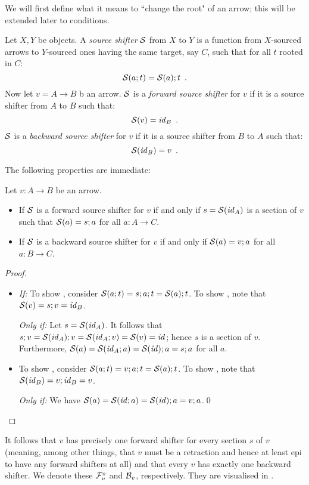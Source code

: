 We will first define what it means to ``change the root" of an arrow; this will be extended later to conditions.
%
\begin{definition}
Let $X,Y$ be objects. A \emph{source shifter} $\mathcal{S}$ from $X$ to $Y$ is a function from $X$-sourced arrows to $Y$-sourced ones having the same target, say $C$, such that for all $t$ rooted in $C$:
%
\begin{equation}\eqlabel{shifters are functors}
\cS(a;t) = \cS(a);t \enspace.
\end{equation}
%
Now let $v=A\to B$ b an arrow. $\mathcal{S}$ is a \emph{forward source shifter} for $v$ if it is a source shifter from $A$ to $B$ such that:
%
\begin{equation}\eqlabel{forward condition}
\cS(v) = \id_B \enspace.
\end{equation}
%
$\mathcal{S}$ is a \emph{backward source shifter} for $v$ if it is a source shifter from $B$ to $A$ such that:
%
\begin{equation}\eqlabel{backward condition}
\cS(\id_B) = v \enspace.
\end{equation}
\end{definition}
%
The following properties are immediate:
%
\begin{proposition}
Let $v:A\to B$ be an arrow.
\begin{itemize}
\item If $\mathcal{S}$ is a forward source shifter for $v$ if and only if $s=\mathcal{S}(\mathit{id}_A)$ is a section of $v$ such that $\mathcal{S}(a)=s;a$ for all $a:A\to C$.
\item If $\mathcal{S}$ is a backward source shifter for $v$ if and only if $\mathcal{S}(a)=v;a$ for all $a:B\to C$.
\end{itemize}
\end{proposition}
%
\begin{proof}~
\begin{itemize}
\item \textit{If:} To show , consider $\mathcal{S}(a;t)=s;a;t=\mathcal{S}(a);t$. To show , note that $\mathcal{S}(v)=s;v=\mathit{id}_B$.

\smallskip
\textit{Only if:} Let $s=\mathcal{S}(\mathit{id}_A)$. It follows that $s;v=\mathcal{S}(\mathit{id}_A);v=\mathcal{S}(\mathit{id}_A;v)=\mathcal{S}(v)=\mathit{id}$; hence $s$ is a section of $v$. Furthermore, $\mathcal{S}(a)=\mathcal{S}(\mathit{id}_A;a)=\mathcal{S}(\mathit{id});a=s;a$ for all $a$.

\item {} To show , consider $\mathcal{S}(a;t)=v;a;t=\mathcal{S}(a);t$. To show , note that $\mathcal{S}(\mathit{id}_B)=v;\mathit{id}_B=v$.

\smallskip
\textit{Only if:} We have $\mathcal{S}(a)=\mathcal{S}(\mathit{id};a)=\mathcal{S}(\mathit{id});a=v;a$.\qed
\end{itemize}
\end{proof}
%
It follows that $v$ has precisely one forward shifter for every section $s$ of $v$ (meaning, among other things, that $v$ must be a retraction and hence at least epi to have any forward shifters at all) and that every $v$ has exactly one backward shifter. We denote these $\mathcal{F}_v^s$ and $\mathcal{B}_v$, respectively. They are visualised in .

